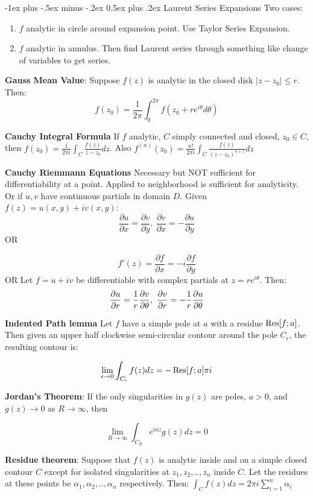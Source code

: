 \documentclass{article}
\makeatletter
\theoremstyle{definition}
\renewcommand{\section}{\@startsection{section}{1}{0mm}%
	{-1ex plus -.5ex minus -.2ex}%
	{0.5ex plus .2ex}%
	{\normalfont\large\bfseries}}
\makeatother
\begin{document}
\begin{multicols}{3}
\section{Laurent Series Expansions}
Two cases:
\begin{enumerate}
	\item $f$ analytic in circle around expansion point. Use Taylor Series Expansion.
	\item $f$ analytic in annulus. Then find Laurent series through something like change of variables to get series.
\end{enumerate}
\textbf{Gauss Mean Value}:
Suppose $f(z)$ is analytic in the closed disk $|z-z_0| \leq r$. Then:
$$f(z_0) = \frac{1}{2 \pi } \int_{0}^{2\pi} f(z_0 + r e^{i\theta} d\theta)$$

\textbf{Cauchy Integral Formula}
If $f$ analytic, $C$ simply connected and closed, $z_0 \in C$, then $f(z_0) = \frac{1}{2\pi i}\int_{C} \frac{f(z)}{z-z_0}dz$. Also $f^{(n)}(z_0) = \frac{n!}{2\pi i } \int_C \frac{f(z)}{(z-z_0)^{n+1}}dz$

\textbf{Cauchy Riemmann Equations} Necessary but NOT sufficient for differentiability at a point. Applied to neighborhood is sufficient for analyticity. Or if $u, v$ have continuous partials in domain $D$. 
Given $f(z) = u(x,y)+iv(x,y)$:
$$\frac{\partial u}{\partial x} = \frac{\partial v}{\partial y},\ \frac{\partial v}{\partial x} = -\frac{\partial u}{\partial y}$$
OR

$$f'(z) = \frac{\partial f}{\partial x} = -i \frac{\partial f}{\partial y}$$
OR 
Let $f=u+iv$ be differentiable with complex partials at $z=re^{i\theta}$. Then:
$$\pdv{u}{r} = \frac{1}{r} \pdv{v}{\theta},\ \pdv{v}{r} = -\frac{1}{r} \pdv{u}{\theta}$$


\textbf{Indented Path lemma}
Let $f$ have a simple pole at $a$ with a residue $\Res[f;a]$. Then given an upper half clockwise semi-circular contour around the pole $C_\epsilon$, the resulting contour is:

\begin{align}
\lim_{\epsilon\to0} \int_{C_\epsilon} f(z) dz = -\Res[f;a]\pi i
\end{align}

\textbf{Jordan's Theorem}: If the only singularities in $g(z)$ are poles, $a>0$, and $g(z) \to 0$ as $R \to \infty$, then 

$$\lim_{R \to \infty} \int_{C_R}e^{iaz}g(z) dz = 0$$

\textbf{Residue theorem}: Suppose that $f(z)$ is analytic inside and on a simple closed contour $C$ except for isolated singularities at $z_1, z_2,..,z_n$ inside $C$. Let the residues at these points be $\alpha_1, \alpha_2,..,\alpha_n$ respectively. Then:
$\int_C f(z) dz = 2 \pi i \sum_{i=1}^n \alpha_i$



\end{multicols}
\end{document}
